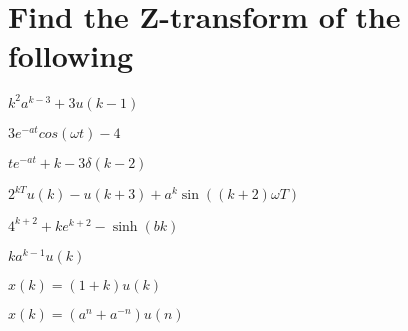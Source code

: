 \documentclass[14pt]{extarticle}
\begin{document}
\section{Find the Z-transform of the following}
\begin{exercise}
    \(k^2 a^{k-3} + 3u(k-1)\)
\end{exercise}
\fillwithdottedlines
\begin{exercise}
    \(3e^{-at} cos(\omega t)-4\)
\end{exercise}
\fillwithdottedlines
\newpage
\begin{exercise}
    \(t e^{-at} + k - 3 \delta(k-2)\)
\end{exercise}
\fillwithdottedlines
\begin{exercise}
    \(2^{kT} u(k) - u(k+3) + a^k \sin((k+2) \omega T)\)
\end{exercise}
\fillwithdottedlines
\begin{exercise}
    \(4^{k+2} + k e^{k+2} - \sinh(bk)\)
\end{exercise}
\fillwithdottedlines
\begin{exercise}
    \(k a^{k-1} u(k)\)
\end{exercise}
\fillwithdottedlines
\begin{exercise}
    \(x(k) = (1+k)u(k)\)
\end{exercise}
\fillwithdottedlines
\begin{exercise}
    \(x(k) = (a^n + a^{-n}) u(n)\)
\end{exercise}
\fillwithdottedlines
\end{document}
